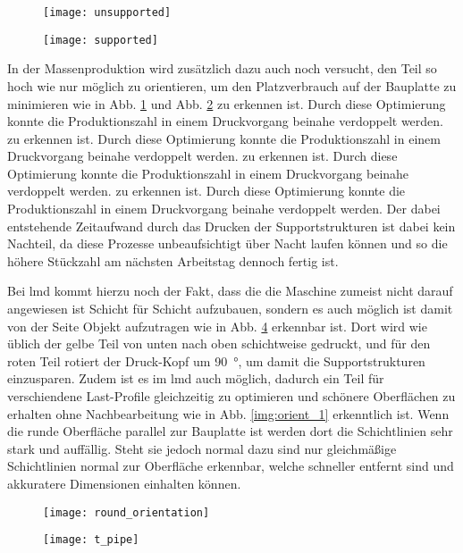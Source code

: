 \documentclass[../main.tex]{subfiles}
\begin{document}
\begin{figure}[H]
	\centering
	\texttt{[image: unsupported]}
	\label{img:unsupp_1}
\end{figure}
\begin{figure}[H]
	\centering
	\texttt{[image: supported]}
	\label{img:supp_1}
\end{figure}
In der Massenproduktion wird zusätzlich dazu auch noch versucht, den Teil so hoch wie nur möglich zu orientieren, um den Platzverbrauch auf der Bauplatte zu minimieren wie in Abb. \ref{img:unsupp_1} und Abb. \ref{img:supp_1} zu erkennen ist. Durch diese Optimierung konnte die Produktionszahl in einem Druckvorgang beinahe verdoppelt werden.  zu erkennen ist. Durch diese Optimierung konnte die Produktionszahl in einem Druckvorgang beinahe verdoppelt werden.  zu erkennen ist. Durch diese Optimierung konnte die Produktionszahl in einem Druckvorgang beinahe verdoppelt werden.  zu erkennen ist. Durch diese Optimierung konnte die Produktionszahl in einem Druckvorgang beinahe verdoppelt werden. Der dabei entstehende Zeitaufwand durch das Drucken der Supportstrukturen ist dabei kein Nachteil, da diese Prozesse unbeaufsichtigt über Nacht laufen können und so die höhere Stückzahl am nächsten Arbeitstag dennoch fertig ist. \cite{lim2015}

Bei \acrfull{lmd} kommt hierzu noch der Fakt, dass die die Maschine zumeist nicht darauf angewiesen ist Schicht für Schicht aufzubauen, sondern es auch möglich ist damit von der Seite Objekt aufzutragen wie in Abb. \ref{img:t_pipe} erkennbar ist. Dort wird wie üblich der gelbe Teil von unten nach oben schichtweise gedruckt, und für den roten Teil rotiert der Druck-Kopf um \qty{90}{\degree}, um damit die Supportstrukturen einzusparen. Zudem ist es im \acrshort{lmd} auch möglich, dadurch ein Teil für verschiendene Last-Profile gleichzeitig zu optimieren und schönere Oberflächen zu erhalten ohne Nachbearbeitung wie in Abb. \ref{img:orient_1} erkenntlich ist. Wenn die runde Oberfläche parallel zur Bauplatte ist werden dort die Schichtlinien sehr stark und auffällig. Steht sie jedoch normal dazu sind nur gleichmäßige Schichtlinien normal zur Oberfläche erkennbar, welche schneller entfernt sind und akkuratere Dimensionen einhalten können.
\begin{figure}[H]
	\centering
	\texttt{[image: round\_orientation]}

	\label{img:round_orient}
\end{figure}
\begin{figure}[H]
	\centering
	\texttt{[image: t\_pipe]}
	\label{img:t_pipe}
\end{figure}
\end{document}
